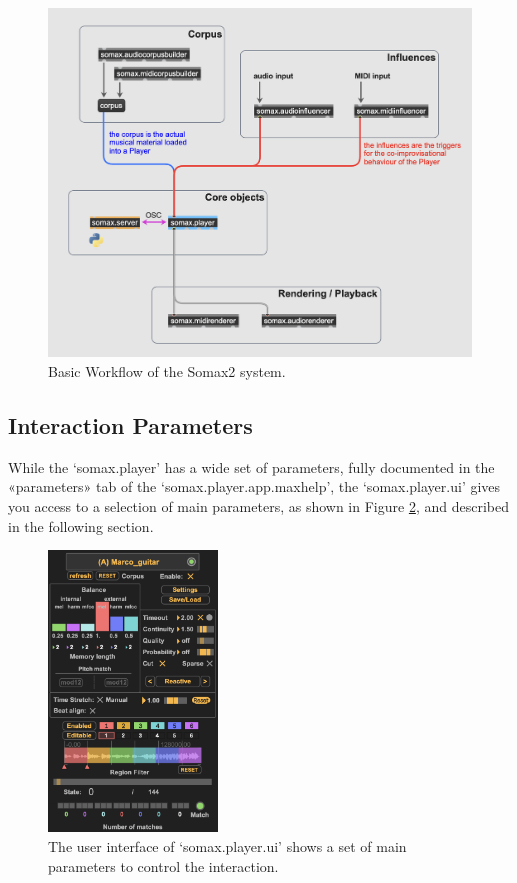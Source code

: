  \begin{figure}[h!]
    \centering        
 	\includegraphics[width=1\textwidth, keepaspectratio]{img/somax_workflow.png}
    \caption{Basic Workflow of the Somax2 system.}
    \label{fig:workflow}
\end{figure}


\subsection{Interaction Parameters}\label{sec:parameters}

While the `somax.player' has a wide set of parameters, fully documented in the «parameters» tab of the `somax.player.app.maxhelp', the `somax.player.ui' gives you access to a selection of main parameters, as shown in Figure \ref{fig:player_ui}, and described in the following section. 

 \begin{figure}[h]
    \centering        
 	\includegraphics[width=0.4\textwidth, trim=0 0 0 5, clip]{img/player_compact_regions.png}
    \caption{The user interface of `somax.player.ui' shows a set of main parameters to control the interaction.}
    \label{fig:player_ui}
\end{figure}

